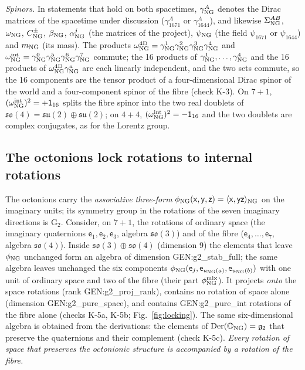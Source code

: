 \emph{Spinors.} In statements that hold on both spacetimes, $\gamma^A_{\rm NG}$ denotes the Dirac
matrices of the spacetime under discussion ($\gamma^A_{1671}$ or $\gamma^A_{1644}$), and likewise
$\Sigma^{AB}_{\rm NG}$, $\omega_{\rm NG}$, $C^\pm_{\rm NG}$, $\beta_{\rm NG}$, $\alpha^j_{\rm NG}$ (the matrices
of the project), $\psi_{\rm NG}$ (the field $\psi_{1671}$ or $\psi_{1644}$) and $m_{\rm NG}$ (its mass). The products
$\omega^{\rm 4D}_{\rm NG}=\gamma^1_{\rm NG}\gamma^2_{\rm NG}\gamma^3_{\rm NG}\gamma^4_{\rm NG}$ and
$\omega^{\rm int}_{\rm NG}=\gamma^0_{\rm NG}\gamma^5_{\rm NG}\gamma^6_{\rm NG}\gamma^7_{\rm NG}$ commute; the 16
products of $\gamma^1_{\rm NG},\dots,\gamma^4_{\rm NG}$ and the 16 products of
$\omega^{\rm 4D}_{\rm NG}\gamma^a_{\rm NG}$ are each linearly independent, and the two sets commute, so the 16 components are the tensor product of a
four-dimensional Dirac spinor of the world and a four-component spinor of the fibre (check K-3). On
$7+1$, $(\omega^{\rm int}_{\rm NG})^2=+\mathsf 1_{16}$ splits the fibre spinor into the two real doublets of
$\mathfrak{so}(4)=\mathfrak{su}(2)\oplus\mathfrak{su}(2)$; on $4+4$, $(\omega^{\rm int}_{\rm NG})^2=-\mathsf 1_{16}$ and the
two doublets are complex conjugates, as for the Lorentz group.

\subsection{The octonions lock rotations to internal rotations}

The octonions carry the \emph{associative three-form} $\phi_{\rm NG}(\mathsf x,\mathsf y,\mathsf z)=
\langle\mathsf x,\mathsf y\mathsf z\rangle_{\rm NG}$ on the imaginary units; its symmetry group in the rotations
of the seven imaginary directions is $\mathrm G_2$. Consider, on $7+1$, the rotations of ordinary space
(the imaginary quaternions $\mathsf e_1,\mathsf e_2,\mathsf e_3$, algebra $\mathfrak{so}(3)$) and of the fibre
($\mathsf e_4,\dots,\mathsf e_7$, algebra $\mathfrak{so}(4)$). Inside $\mathfrak{so}(3)\oplus\mathfrak{so}(4)$ (dimension 9)
the elements that leave $\phi_{\rm NG}$ unchanged form an algebra of dimension
{{GEN:g2_stab_full}}; the same algebra leaves unchanged the six components
$\phi_{\rm NG}(\mathsf e_j,\mathsf e_{u_{\rm NG}(a)},\mathsf e_{u_{\rm NG}(b)})$ with one unit of ordinary space and two of the fibre (their part
$\phi^{\rm mix}_{\rm NG}$). It projects \emph{onto} the space rotations (rank
{{GEN:g2_proj_rank}}), contains no rotation of space alone (dimension {{GEN:g2_pure_space}}), and
contains {{GEN:g2_pure_int}} rotations of the fibre alone (checks K-5a, K-5b; Fig.~\ref{fig:locking}).
The same six-dimensional algebra is obtained from the derivations: the elements of
$\mathrm{Der}(\mathbb O_{\rm NG})=\mathfrak g_2$ that preserve the quaternions and their complement (check
K-5c). \emph{Every rotation of space that preserves the octonionic structure is accompanied by a
rotation of the fibre.}

